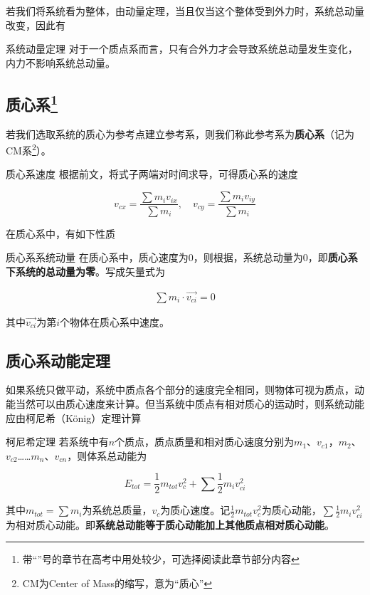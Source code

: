 若我们将系统看为整体，由动量定理，当且仅当这个整体受到外力时，系统总动量改变，因此有

\begin{theo}{系统动量定理}{}
对于一个质点系而言，只有合外力才会导致系统总动量发生变化，内力不影响系统总动量。
\end{theo}

\subsection{质心系\quad \dag \protect \footnote{带“\dag”号的章节在高考中用处较少，可选择阅读此章节部分内容}}

若我们选取系统的质心为参考点建立参考系，则我们称此参考系为\textbf{质心系}（记为CM系\footnote{CM为Center of Mass的缩写，意为“质心”}）。

\begin{defi}[label=zxxsd]{质心系速度}{}
根据前文，将式子两端对时间求导，可得质心系的速度

$$v_{cx} = \frac{\sum m_i v_{ix}}{\sum m_i} ,\quad v_{cy} = \frac{\sum m_i v_{iy}}{\sum m_i}$$
\end{defi}

在质心系中，有如下性质

\begin{theo}[label=zxxxtdl]{质心系系统动量}{}
在质心系中，质心速度为$0$，则根据，系统总动量为$0$，即\textbf{质心系下系统的总动量为零}。写成矢量式为

\begin{equation}
\begin{aligned}
\sum m_i \cdot \vec{v_{ci}} = 0
\end{aligned}
\label{e_zxxdl}
\end{equation}

其中$\vec{v_{ci}}$为第$i$个物体在质心系中速度。
\end{theo}

\subsection{质心系动能定理 \quad \dag}

如果系统只做平动，系统中质点各个部分的速度完全相同，则物体可视为质点，动能当然可以由质心速度来计算。但当系统中质点有相对质心的运动时，则系统动能应由柯尼希（König）定理计算

\begin{theo}[label=knxdl]{柯尼希定理}{}
若系统中有$n$个质点，质点质量和相对质心速度分别为$m_1$、$v_{c1}$，$m_2$、$v_{c2}$……$m_n$、$v_{cn}$，则体系总动能为

$$E_{tot}=\frac{1}{2} m_{tot} v_c^2 + \sum \frac{1}{2} m_i v_{ci}^2$$

其中$m_{tot} = \sum m_i$为系统总质量，$v_c$为质心速度。记$\frac{1}{2} m_{tot} v_c^2$为质心动能，$\sum \frac{1}{2} m_i v_{ci}^2$为相对质心动能。即\textbf{系统总动能等于质心动能加上其他质点相对质心动能}。
\end{theo}


